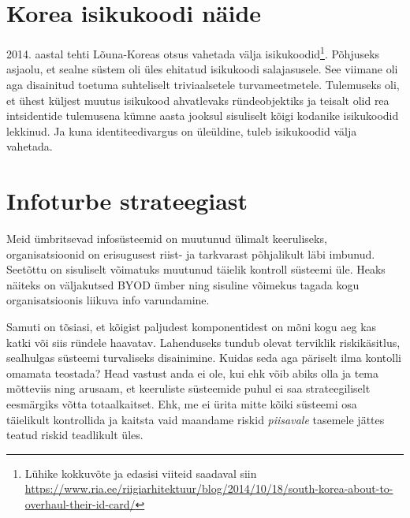 \documentclass{tufte-book}
\begin{document}

\section{Korea isikukoodi näide}
2014. aastal tehti Lõuna-Koreas otsus vahetada välja isikukoodid\footnote{Lühike kokkuvõte ja edasisi viiteid saadaval siin \url{https://www.ria.ee/riigiarhitektuur/blog/2014/10/18/south-korea-about-to-overhaul-their-id-card/}}. Põhjuseks asjaolu, et sealne süstem oli üles ehitatud isikukoodi salajasusele. See viimane oli aga disainitud toetuma suhteliselt triviaalsetele turvameetmetele. Tulemuseks oli, et ühest küljest muutus isikukood ahvatlevaks ründeobjektiks ja teisalt olid rea intsidentide tulemusena kümne aasta jooksul sisuliselt kõigi kodanike isikukoodid lekkinud. Ja kuna identiteedivargus on üleüldine, tuleb isikukoodid välja vahetada.

\section{Infoturbe strateegiast}
Meid ümbritsevad infosüsteemid on muutunud ülimalt keeruliseks, organisatsioonid on erisugusest riist- ja tarkvarast põhjalikult läbi imbunud. Seetõttu on sisuliselt võimatuks muutunud täielik kontroll süsteemi üle. Heaks näiteks on väljakutsed BYOD ümber ning sisuline võimekus tagada kogu organisatsioonis liikuva info varundamine. 

Samuti on tõsiasi, et kõigist paljudest komponentidest on mõni kogu aeg kas katki või siis ründele haavatav. Lahenduseks tundub olevat terviklik riskikäsitlus, sealhulgas süsteemi turvaliseks disainimine. Kuidas seda aga päriselt ilma kontolli omamata teostada? Head vastust anda ei ole, kui ehk võib abiks olla \citeauthor{leveson2011engineering}\cite{leveson2011engineering} ja tema mõtteviis ning arusaam, et keeruliste süsteemide puhul ei saa strateegiliselt eesmärgiks võtta totaalkaitset. Ehk, me ei ürita mitte kõiki süsteemi osa täielikult kontrollida ja kaitsta vaid maandame riskid \emph{piisavale} tasemele jättes teatud riskid teadlikult üles. 
\end{document}
